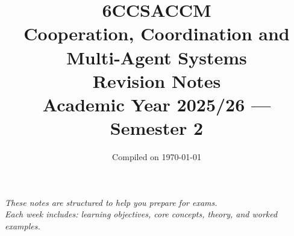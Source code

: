 \documentclass[10pt]{article}
\title{%
  \vspace{-1cm}
  {\LARGE\bfseries 6CCSACCM}\\[0.3cm]
  {\Huge Cooperation, Coordination and}\\[0.2cm]
  {\Huge Multi-Agent Systems}\\[0.5cm]
  {\Large Revision Notes}\\[0.3cm]
  {\large Academic Year 2025/26 --- Semester 2}
}
\author{}
\date{\vspace{-0.5cm}Compiled on \today}
\begin{document}
\maketitle
\thispagestyle{empty}

\vfill
\begin{center}
\textit{These notes are structured to help you prepare for exams.\\
Each week includes: learning objectives, core concepts, theory, and worked examples.}
\end{center}
\vfill

\clearpage
\tableofcontents

\clearpage


\clearpage


\clearpage


\clearpage


\clearpage


\clearpage



\clearpage


\clearpage


\clearpage


\clearpage


\clearpage

\end{document}
